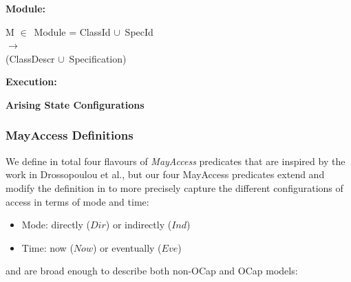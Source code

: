 \documentclass[a4paper,11pt, twoside,twocolumn]{article}
\newenvironment{logic}
{\begin{minipage}[c]{\linewidth}  \small \vspace{0.5em}\begin{tabbing}}
{\end{tabbing}\end{minipage}\vspace{0.5em}}
\newcommand{\loin}{$\in$}
\newcommand{\locup} {$\cup$}
\newcommand{\ablock} {\null\qquad}
\begin{document}
\textbf{Module:}

\begin{logic}
M \loin\ Module = ClassId \locup\ SpecId\\\ablock\qquad\qquad\quad $\rightarrow$ \\
\ablock \qquad \qquad \quad (ClassDescr \locup\ Specification)
\end{logic}

\textbf{Execution:}\\
\begin{logic}\end{logic}



\textbf{Arising State Configurations}\\
\begin{logic}\end{logic}


\subsubsection{MayAccess Definitions}
We define in total four flavours of \textit{MayAccess} predicates that are inspired by the work in Drossopoulou et al.\cite{drossopoulou2015b}, but our four MayAccess predicates extend and modify the definition in \cite{drossopoulou2015b} to more precisely capture the different configurations of access in terms of mode and time: 
\begin{itemize}
\item Mode: directly ($Dir$) or indirectly ($Ind$)
\item Time: now ($Now$) or eventually ($Eve$)
\end{itemize}
and are broad enough to describe both non-OCap and OCap models:
\end{document}
